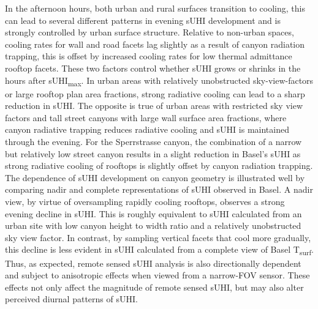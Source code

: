 \begin{bibunit}
In the afternoon hours, both urban and rural surfaces transition to cooling, this can lead to several different patterns in evening sUHI development and is strongly controlled by urban surface structure. Relative to non-urban spaces, cooling rates for wall and road facets lag slightly as a result of canyon radiation trapping, this is offset by increased cooling rates for low thermal admittance rooftop facets. These two factors control whether sUHI grows or shrinks in the hours after sUHI\textsubscript{max}. In urban areas with relatively unobstructed sky-view-factors or large rooftop plan area fractions, strong radiative cooling can lead to a sharp reduction in sUHI. The opposite is true of urban areas with restricted sky view factors and tall street canyons with large wall surface area fractions, where canyon radiative trapping reduces radiative cooling and sUHI is maintained through the evening. For the Sperrstrasse canyon, the combination of a narrow but relatively low street canyon results in a slight reduction in Basel's sUHI as strong radiative cooling of rooftops is slightly offset by canyon radiation trapping. The dependence of sUHI development on canyon geometry is illustrated well by comparing nadir and complete representations of sUHI observed in Basel. A nadir view, by virtue of oversampling rapidly cooling rooftops, observes a strong evening decline in sUHI. This is roughly equivalent to sUHI calculated from an urban site with low canyon height to width ratio and a relatively unobstructed sky view factor. In contrast, by sampling vertical facets that cool more gradually, this decline is less evident in sUHI calculated from a complete view of Basel T\textsubscript{surf}. Thus, as expected, remote sensed sUHI analysis is also directionally dependent and subject to anisotropic effects when viewed from a narrow-FOV sensor. These effects not only affect the magnitude of remote sensed sUHI, but may also alter perceived diurnal patterns of sUHI. 
 

\end{bibunit}
